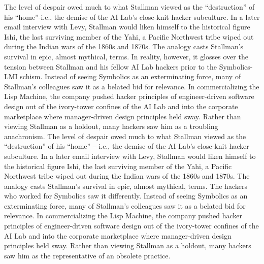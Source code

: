 \ifdefined\eng
\ifdefined\vone
The level of despair owed much to what Stallman viewed as the ``destruction'' of his ``home''-i.e., the demise of the AI Lab's close-knit hacker subculture. In a later email interview with Levy, Stallman would liken himself to the historical figure Ishi, the last surviving member of the Yahi, a Pacific Northwest tribe wiped out during the Indian wars of the 1860s and 1870s. The analogy casts Stallman's survival in epic, almost mythical, terms. In reality, however, it glosses over the tension between Stallman and his fellow AI Lab hackers prior to the Symbolics-LMI schism. Instead of seeing Symbolics as an exterminating force, many of Stallman's colleagues saw it as a belated bid for relevance. In commercializing the Lisp Machine, the company pushed hacker principles of engineer-driven software design out of the ivory-tower confines of the AI Lab and into the corporate marketplace where manager-driven design principles held sway. Rather than viewing Stallman as a holdout, many hackers saw him as a troubling anachronism.
\fi
\ifdefined\vtwo
The level of despair owed much to what Stallman viewed as the ``destruction'' of his ``home'' -- i.e., the demise of the AI Lab's close-knit hacker subculture. In a later email interview with Levy, Stallman would liken himself to the historical figure Ishi, the last surviving member of the Yahi, a Pacific Northwest tribe wiped out during the Indian wars of the 1860s and 1870s. The analogy casts Stallman's survival in epic, almost mythical, terms. The hackers who worked for Symbolics saw it differently. Instead of seeing Symbolics as an exterminating force, many of Stallman's colleagues saw it as a belated bid for relevance. In commercializing the Lisp Machine, the company pushed hacker principles of engineer-driven software design out of the ivory-tower confines of the AI Lab and into the corporate marketplace where manager-driven design principles held sway. Rather than viewing Stallman as a holdout, many hackers saw him as the representative of an obsolete practice.
\fi
\fi

